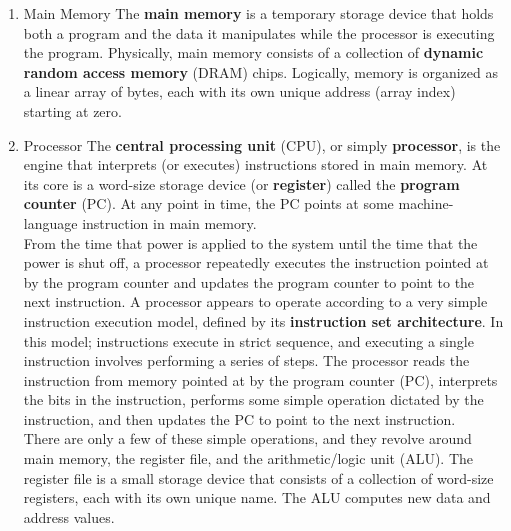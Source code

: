 \documentclass[11pt]{article}
\begin{document}
\begin{enumerate}
\item Main Memory
\label{sec:orga01a346}
The \textbf{main memory} is a temporary storage device that holds both a program and the data it manipulates while the processor is executing the program. Physically, main memory consists of a collection of \textbf{dynamic random access memory} (DRAM) chips. Logically, memory is organized as a linear array of bytes, each with its own unique address (array index) starting at zero.\\

\item Processor
\label{sec:org88ba5a4}
The \textbf{central processing unit} (CPU), or simply \textbf{processor}, is the engine that interprets (or executes) instructions stored in main memory. At its core is a word-size storage device (or \textbf{register}) called the \textbf{program counter} (PC). At any point in time, the PC points at some machine-language instruction in main memory.\\

From the time that power is applied to the system until the time that the power is shut off, a processor repeatedly executes the instruction pointed at by the program counter and updates the program counter to point to the next instruction. A processor appears to operate according to a very simple instruction execution model, defined by its \textbf{instruction set architecture}. In this model; instructions execute in strict sequence, and executing a single instruction involves performing a series of steps. The processor reads the instruction from memory pointed at by the program counter (PC), interprets the bits in the instruction, performs some simple operation dictated by the instruction, and then updates the PC to point to the next instruction.\\

There are only a few of these simple operations, and they revolve around main memory, the register file, and the arithmetic/logic unit (ALU). The register file is a small storage device that consists of a collection of word-size registers, each with its own unique name. The ALU computes new data and address values.\\


\end{enumerate}
\end{document}

